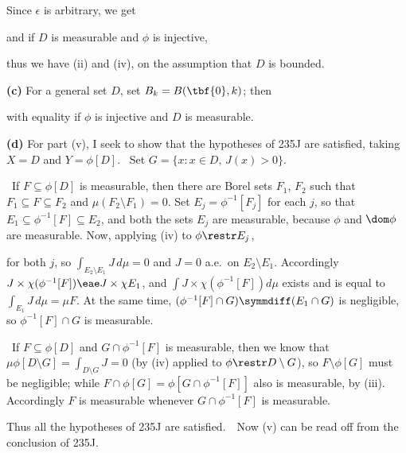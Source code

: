 {

Since $\epsilon$ is arbitrary, we get


\noindent and if $D$ is measurable and $\phi$ is injective,


\noindent thus we have (ii) and (iv), on the assumption that $D$ is
bounded.

\medskip

{\bf (c)} For a general set $D$, set $B_k=B(\tbf{0},k)$;  then


\noindent with equality if $\phi$ is injective and $D$ is measurable.

\medskip

{\bf (d)} For part (v), I seek to show that the
hypotheses of 235J are satisfied, taking $X=D$ and $Y=\phi[D]$.   \Prf\
Set $G=\{x:x\in D,\,J(x)>0\}$.

\medskip

\quad\grheada\ If $F\subseteq\phi[D]$ is measurable, then there are
Borel sets $F_1$, $F_2$ such
that $F_1\subseteq F\subseteq F_2$ and $\mu(F_2\setminus F_1)=0$.   Set
$E_j=\phi^{-1}[F_j]$ for each $j$, so that
$E_1\subseteq \phi^{-1}[F]\subseteq E_2$, and both the sets $E_j$ are
measurable,
because $\phi$ and $\dom\phi$ are measurable.   Now, applying (iv) to
$\phi\restr E_j$,


\noindent for both $j$, so $\int_{E_2\setminus E_1}J\,d\mu=0$ and $J=0$
a.e.\ on $E_2\setminus E_1$.   Accordingly
$J\times\chi(\phi^{-1}[F])\eae J\times\chi E_1$, and
$\int J\times\chi(\phi^{-1}[F])d\mu$ exists and is equal to
$\int_{E_1}J\,d\mu=\mu F$.   At the same time,
$(\phi^{-1}[F]\cap G)\symmdiff(E_1\cap G)$ is negligible, so
$\phi^{-1}[F]\cap G$ is measurable.

\medskip

\quad\grheadb\ If $F\subseteq\phi[D]$ and $G\cap\phi^{-1}[F]$ is
measurable, then we know that $\mu\phi[D\setminus G]=\int_{D\setminus
G}J=0$ (by (iv) applied to $\phi\restr D\setminus G$),
so $F\setminus\phi[G]$ must be negligible;  while
$F\cap\phi[G]=\phi[G\cap\phi^{-1}[F]]$ also is measurable, by (iii).
Accordingly $F$ is measurable whenever $G\cap\phi^{-1}[F]$ is
measurable.

\medskip

Thus all the hypotheses of 235J are satisfied.\ \QeD\   Now (v) can be
read off from the conclusion of 235J.
}%

